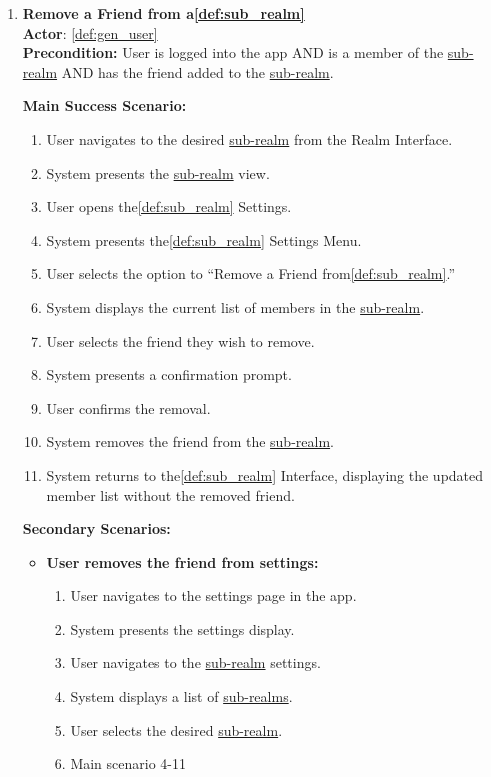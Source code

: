 \documentclass{article}
\begin{document}
\begin{enumerate}[label=\textbf{UC\arabic*}]
    \item \label{uc:22} \textbf{Remove a Friend from a\ref{def:sub_realm}} \\
          \textbf{Actor}: \ref{def:gen_user} \\
          \textbf{Precondition:} User is logged into the app AND is a member of the \hyperref[def:sub_realm]{sub-realm} AND has the friend added to the \hyperref[def:sub_realm]{sub-realm}.

          \textbf{Main Success Scenario:}
          \begin{enumerate}[label=\textbf{\arabic*.}]
              \item User navigates to the desired \hyperref[def:sub_realm]{sub-realm} from the Realm Interface.
              \item System presents the \hyperref[def:sub_realm]{sub-realm} view.
              \item User opens the\ref{def:sub_realm} Settings.
              \item System presents the\ref{def:sub_realm} Settings Menu.
              \item User selects the option to “Remove a Friend from\ref{def:sub_realm}.”
              \item System displays the current list of members in the \hyperref[def:sub_realm]{sub-realm}.
              \item User selects the friend they wish to remove.
              \item System presents a confirmation prompt.
              \item User confirms the removal.
              \item System removes the friend from the \hyperref[def:sub_realm]{sub-realm}.
              \item System returns to the\ref{def:sub_realm} Interface, displaying the updated member list without the removed friend.
          \end{enumerate}

          \textbf{Secondary Scenarios:}
          \begin{itemize}
              \item[{}] \textbf{User removes the friend from settings:}
                    \begin{enumerate}[label=\textbf{\arabic*.}]
                        \item User navigates to the settings page in the app.
                        \item System presents the settings display.
                        \item User navigates to the \hyperref[def:sub_realm]{sub-realm} settings.
                        \item System displays a list of \hyperref[def:sub_realm]{sub-realms}.
                        \item User selects the desired \hyperref[def:sub_realm]{sub-realm}.
                        \item Main scenario 4-11
                    \end{enumerate}


\end{itemize}
\end{enumerate}
\end{document}
